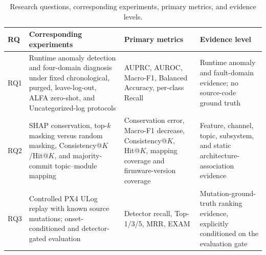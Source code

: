 \begin{table}[H]
\caption{Research questions, corresponding experiments, primary metrics, and evidence levels.\label{tab:research_questions}}
\footnotesize
\begin{tabularx}{\textwidth}{>{\raggedright\arraybackslash}p{0.65cm} >{\raggedright\arraybackslash}p{5.00cm} >{\raggedright\arraybackslash}p{3.15cm} >{\raggedright\arraybackslash}X}
\toprule
\textbf{RQ} & \textbf{Corresponding experiments} & \textbf{Primary metrics} & \textbf{Evidence level}\\
\midrule
RQ1 & Runtime anomaly detection and four-domain diagnosis under fixed chronological, purged, leave-log-out, ALFA zero-shot, and Uncategorized-log protocols & AUPRC, AUROC, Macro-F1, Balanced Accuracy, per-class Recall & Runtime anomaly and fault-domain evidence; no source-code ground truth\\
RQ2 & SHAP conservation, top-$k$ masking versus random masking, Consistency@$K$/Hit@$K$, and majority-commit topic--module mapping & Conservation error, Macro-F1 decrease, Consistency@$K$, Hit@$K$, mapping coverage and firmware-version coverage & Feature, channel, topic, subsystem, and static architecture-association evidence\\
RQ3 & Controlled PX4 ULog replay with known source mutations; onset-conditioned and detector-gated evaluation & Detector recall, Top-1/3/5, MRR, EXAM & Mutation-ground-truth ranking evidence, explicitly conditioned on the evaluation gate\\
\bottomrule
\end{tabularx}
\end{table}
